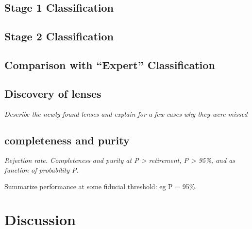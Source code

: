 \documentclass[useAMS,usenatbib,a4paper]{mn2e}
\begin{document}
\subsection{Stage 1 Classification}
\label{sec:results:stage1}


\subsection{Stage 2 Classification}
\label{sec:results:stage2}



\subsection{Comparison with ``Expert'' Classification}
\label{sec:results:experts}




\subsection{Discovery of lenses}
\label{sec:results:disc}


{\it Describe the newly found lenses and explain for a few
cases why they were missed }



\subsection{\cfhtls completeness and purity}
\label{sec:results:sample}

{\it Rejection rate. Completeness and purity at P > retirement, P > 95\%, and 
as function of probability P. 

Summarize performance at some fiducial threshold: eg P = 95\%.}



\section{Discussion}
\label{sec:discuss}
\end{document}
